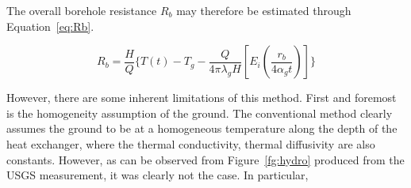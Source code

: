 	The overall borehole resistance $R_b$ may therefore be estimated through Equation~\ref{eq:Rb}\cite{beier_situ_2012}.
	
	\begin{equation}
		R_b = \frac{H}{Q}\{ T(t) - T_g -\frac{Q}{4\pi \lambda_g H} [E_i(\frac{r_b}{4 \alpha_g t})]   \}\label{eq:Rb}
	\end{equation}
	
	However, there are some inherent limitations of this method. First and foremost is the homogeneity assumption of the ground. The conventional method clearly assumes the ground to be at a homogeneous temperature along the depth of the heat exchanger, where the thermal conductivity, thermal diffusivity are also constants. However, as can be observed from Figure~\ref{fg:hydro} produced from the USGS measurement, it was clearly not the case. In particular, 
	
	